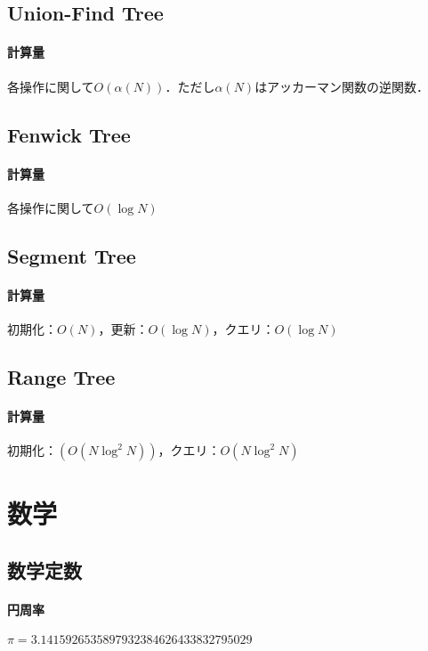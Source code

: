 \documentclass[landscape,twocolumn,9pt]{jsarticle}
\begin{document}
\subsection{Union-Find Tree}
\paragraph{計算量} 各操作に関して$O(\alpha(N))$．ただし$\alpha(N)$はアッカーマン関数の逆関数．


\subsection{Fenwick Tree}
\paragraph{計算量} 各操作に関して$O(\log N)$


\subsection{Segment Tree}
\paragraph{計算量} 初期化：$O(N)$，更新：$O(\log N)$，クエリ：$O(\log N)$


\subsection{Range Tree}
\paragraph{計算量} 初期化：$(O(N \log^2 N))$，クエリ：$O(N \log^2 N)$


\section{数学}%
\subsection{数学定数}
\paragraph{円周率} \hspace{12.16mm}
$ \pi=   3.1415926535897932384626433832795029 $
\end{document}
